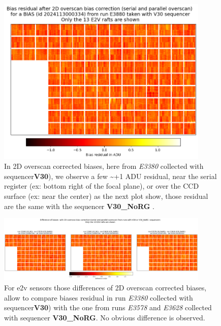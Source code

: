 \begin{figure}[ht]
\begin{centering}
\includegraphics[width=0.9\textwidth]{figures/PA_2D_filtred_RG_NoRG_FOnly__2024113000334.png}
\end{centering}
\caption{In 2D overscan corrected biases, here from {\it E3380} collected with sequencer{\bf V30}), we observe a few \textasciitilde+1 ADU residual, near the serial register (ex: bottom right of the focal plane), or over the CCD surface (ex: near the center) as the next plot show, those residual are the same with the sequencer {\bf V30\_NoRG }.}\label{fig:2DNoRGRaw}
\end{figure}

\begin{figure}[ht]
\begin{centering}
\includegraphics[width=0.9\textwidth]{figures/PA_2D_filtred_RG_NoRG_FOnly_2024120200302_2024120200195_2024113000334.png}
\end{centering}
\caption{For e2v sensors those differences of 2D overscan corrected biases, allow to compare  biases residual in run {\it E3380} collected  with sequencer{\bf V30}) with the one from runs  {\it E3578} and {\it E3628} collected with sequencer {\bf V30\_NoRG}. No obvious difference is observed.}\label{fig:2DNoRGEffect}
\end{figure}

